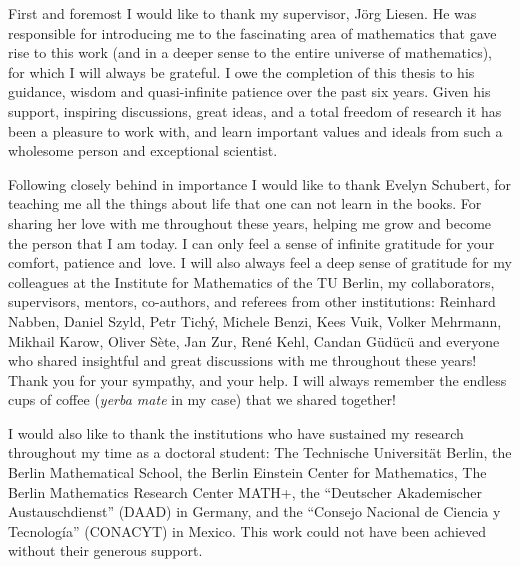 \begin{changemargin}{-0.2cm}{-0.2cm}
\noindent
First and foremost I would like to thank my supervisor, J{\"o}rg Liesen.
He was responsible for introducing me to the fascinating area of mathematics that gave rise to this work (and in a deeper sense to the entire universe of mathematics), for which I will always be grateful. I owe the completion of this thesis to his guidance, wisdom and quasi-infinite patience over the past six years. Given his support, inspiring discussions, great ideas, and a total freedom of research it has been a pleasure to work with, and learn important values and ideals from such a wholesome person and exceptional scientist.

Following closely behind in importance I would like to thank Evelyn Schubert,
for teaching me all the things about life that one can not learn in the books. For sharing her love with me throughout these years, helping me grow and become the person that I am today. I can only feel a sense of infinite gratitude for your comfort, patience and~love.\linebreak
\indent I will also always feel a deep sense of gratitude for my colleagues at the Institute for Mathematics of the TU Berlin, my collaborators, supervisors, mentors, co-authors, and referees from other institutions: Reinhard Nabben, Daniel Szyld, Petr Tich{\'y}, Michele Benzi, Kees Vuik, Volker Mehrmann, Mikhail Karow, Oliver S{\`e}te, Jan Zur, Ren{\'e} Kehl, Candan G{\"u}d{\"u}c{\"u} and everyone who shared insightful and great discussions with me throughout these years! Thank you for your sympathy, and your help. I will always remember the endless cups of coffee (\emph{yerba mate} in my case) that we shared together!

I would also like to thank the institutions who have sustained my research throughout my time as a doctoral student: The Technische Universit\"at Berlin, the Berlin Mathematical School, the Berlin Einstein Center for Mathematics, The Berlin Mathematics Research Center MATH+, the ``Deutscher Akademischer Austauschdienst'' (DAAD) in Germany, and the ``Consejo Nacional de Ciencia y Tecnolog\'ia'' (CONACYT) in Mexico. This work could not have been achieved without their generous support.



\end{changemargin}
